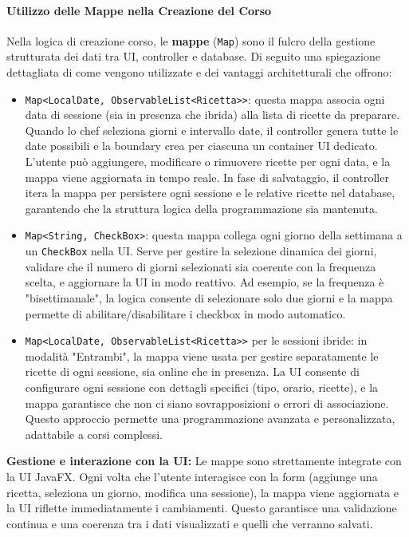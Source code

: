 \paragraph{Utilizzo delle Mappe nella Creazione del Corso}

Nella logica di creazione corso, le \textbf{mappe} (\texttt{Map}) sono il fulcro della gestione strutturata dei dati tra UI, controller e database. Di seguito una spiegazione dettagliata di come vengono utilizzate e dei vantaggi architetturali che offrono:

\begin{itemize}
    \item \texttt{Map<LocalDate, ObservableList<Ricetta>>}: questa mappa associa ogni data di sessione (sia in presenza che ibrida) alla lista di ricette da preparare. Quando lo chef seleziona giorni e intervallo date, il controller genera tutte le date possibili e la boundary crea per ciascuna un container UI dedicato. L'utente può aggiungere, modificare o rimuovere ricette per ogni data, e la mappa viene aggiornata in tempo reale. In fase di salvataggio, il controller itera la mappa per persistere ogni sessione e le relative ricette nel database, garantendo che la struttura logica della programmazione sia mantenuta.
    \item \texttt{Map<String, CheckBox>}: questa mappa collega ogni giorno della settimana a un \texttt{CheckBox} nella UI. Serve per gestire la selezione dinamica dei giorni, validare che il numero di giorni selezionati sia coerente con la frequenza scelta, e aggiornare la UI in modo reattivo. Ad esempio, se la frequenza è "bisettimanale", la logica consente di selezionare solo due giorni e la mappa permette di abilitare/disabilitare i checkbox in modo automatico.
    \item \texttt{Map<LocalDate, ObservableList<Ricetta>>} per le sessioni ibride: in modalità "Entrambi", la mappa viene usata per gestire separatamente le ricette di ogni sessione, sia online che in presenza. La UI consente di configurare ogni sessione con dettagli specifici (tipo, orario, ricette), e la mappa garantisce che non ci siano sovrapposizioni o errori di associazione. Questo approccio permette una programmazione avanzata e personalizzata, adattabile a corsi complessi.
\end{itemize}

\textbf{Gestione e interazione con la UI:} Le mappe sono strettamente integrate con la UI JavaFX. Ogni volta che l'utente interagisce con la form (aggiunge una ricetta, seleziona un giorno, modifica una sessione), la mappa viene aggiornata e la UI riflette immediatamente i cambiamenti. Questo garantisce una validazione continua e una coerenza tra i dati visualizzati e quelli che verranno salvati.

